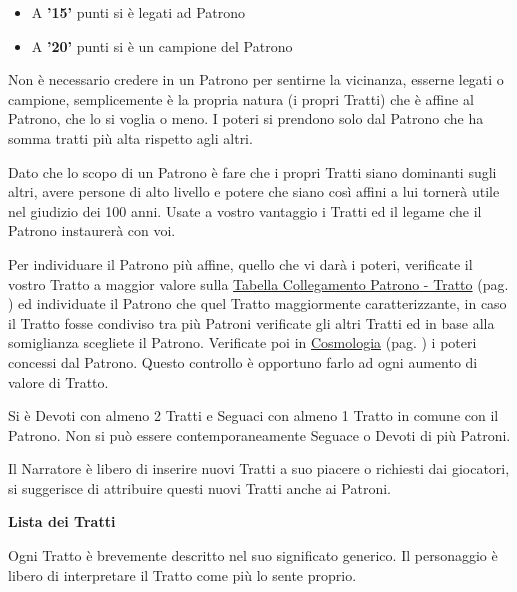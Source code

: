\begin{multicols}{2}
\begin{itemize}[leftmargin=*]
\item A \textbf{'15'} punti si è legati ad Patrono

\item A \textbf{'20'} punti si è un campione del Patrono
\end{itemize}

Non è necessario credere in un Patrono per sentirne la vicinanza, esserne legati o campione, semplicemente è la propria natura (i propri Tratti) che è affine al Patrono, che lo si voglia o meno. I poteri si prendono solo dal Patrono che ha somma tratti più alta rispetto agli altri.

Dato che lo scopo di un Patrono è fare che i propri Tratti siano dominanti sugli altri, avere persone di alto livello e potere che siano così affini a lui tornerà utile nel giudizio dei 100 anni. Usate a vostro vantaggio i Tratti ed il legame che il Patrono instaurerà con voi.

Per individuare il Patrono più affine, quello che vi darà i poteri, verificate il vostro Tratto a maggior valore sulla \hyperlink{tabellacollegamentopatronotratto}{Tabella Collegamento Patrono - Tratto} (pag. \pageref{tabellacollegamentopatronotratto}) ed individuate il Patrono che quel Tratto maggiormente caratterizzante, in caso il Tratto fosse condiviso tra più Patroni verificate gli altri Tratti ed in base alla somiglianza scegliete il Patrono.
Verificate poi in \hyperlink{cosmologia}{Cosmologia} (pag. \pageref{patroni}) i poteri concessi dal Patrono. Questo controllo è opportuno farlo ad ogni aumento di valore di Tratto.

Si è Devoti con almeno 2 Tratti e Seguaci con almeno 1 Tratto in comune con il Patrono. Non si può essere contemporaneamente Seguace o Devoti di più Patroni.

Il Narratore è libero di inserire nuovi Tratti a suo piacere o richiesti dai giocatori, si suggerisce di attribuire questi nuovi Tratti anche ai Patroni.

\medskip

\textbf{Lista dei Tratti}

Ogni Tratto è brevemente descritto nel suo significato generico. Il personaggio è libero di interpretare il Tratto come più lo sente proprio.

\medskip


\end{multicols}
